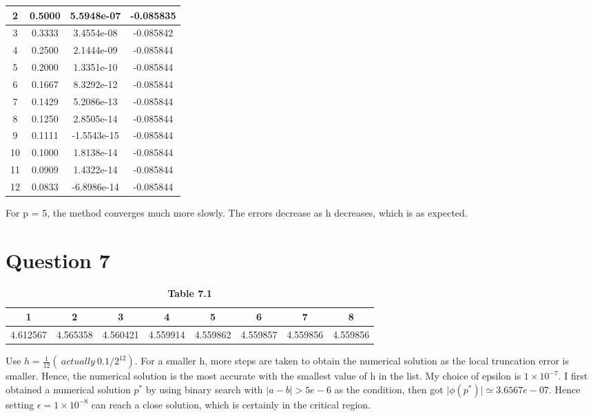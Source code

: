 \documentclass[11pt]{article}
\begin{document}
\begin{table}[H]
\begin{subtable}{.5\linewidth}
\begin{tabular}{|c|c|c|c|}
\hline                            
2 & 0.5000  & 5.5948e-07 & -0.085835\\ 
\hline                            
3 & 0.3333  & 3.4554e-08 & -0.085842\\ 
\hline                            
4 & 0.2500  & 2.1444e-09 & -0.085844\\ 
\hline                            
5 & 0.2000  & 1.3351e-10 & -0.085844\\ 
\hline                            
6 & 0.1667 & 8.3292e-12  & -0.085844\\ 
\hline                            
7 & 0.1429  & 5.2086e-13 & -0.085844 \\ 
\hline                            
8 & 0.1250  & 2.8505e-14 & -0.085844\\ 
\hline                            
9 & 0.1111  & -1.5543e-15& -0.085844\\ 
\hline                            
10 & 0.1000 & 1.8138e-14 & -0.085844 \\
\hline                            
11 & 0.0909  & 1.4322e-14 & -0.085844\\
\hline                            
12 & 0.0833  & -6.8986e-14 & -0.085844\\
\hline                                
\end{tabular}                    
\end{subtable} 
\end{table}                   
For p = 5, the method converges much more slowly. The errors decrease as h decreases, which is as expected.
\section*{Question 7}
\begin{table}[H]                            
\centering                               
\begin{tabular}{|c|c|c|c|c|c|c|c|}             
\hline                                   
 1 & 2 & 3 &4 & 5 & 6 & 7 & 8\\                      
\hline 
4.612567 & 4.565358 & 4.560421 & 4.559914 & 
4.559862 & 
4.559857 & 4.559856 & 4.559856 \\
\hline
\end{tabular}                            
\caption{\textbf{Table 7.1}}                 
\label{table:MyTableLabel}               
\end{table}     
Use $h = \frac{1}{12}(\ actually\ 0.1/2^{12})$. For a smaller h, more steps are taken to obtain the numerical solution as the local truncation error is smaller. Hence, the numerical solution is the most accurate with the smallest value of h in the list.
My choice of epsilon is $1 \times 10^{-7}$. I first obtained a numerical solution $p^{*}$ by using binary search with $\mathopen|a-b\mathclose| > 5e-6$ as the condition, then got $\mathopen|\phi(p^{*})\mathclose| \simeq 3.6567e-07$. Hence setting $\epsilon = 1 \times 10^{-8}$ can reach a close solution, which is certainly in the critical region.
\end{document}
